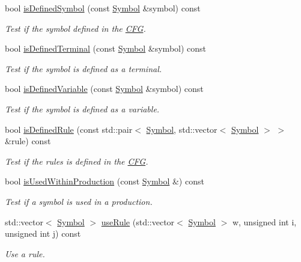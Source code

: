\begin{DoxyCompactItemize}
bool \hyperlink{class_c_f_g_ae31c239915f8b277ac3c5e2411d65546}{is\-Defined\-Symbol} (const \hyperlink{class_symbol}{\-Symbol} \&symbol) const 
\begin{DoxyCompactList}\small\item\em \-Test if the symbol defined in the \hyperlink{class_c_f_g}{\-C\-F\-G}. \end{DoxyCompactList}\item 
bool \hyperlink{class_c_f_g_af948fe36ac86b3a1c1d05f9d017ee7b9}{is\-Defined\-Terminal} (const \hyperlink{class_symbol}{\-Symbol} \&symbol) const 
\begin{DoxyCompactList}\small\item\em \-Test if the symbol is defined as a terminal. \end{DoxyCompactList}\item 
bool \hyperlink{class_c_f_g_a388a133e1134133d5190d8f4e4845042}{is\-Defined\-Variable} (const \hyperlink{class_symbol}{\-Symbol} \&symbol) const 
\begin{DoxyCompactList}\small\item\em \-Test if the symbol is defined as a variable. \end{DoxyCompactList}\item 
bool \hyperlink{class_c_f_g_aef9f3ebd336911e82b732ad30bc85669}{is\-Defined\-Rule} (const std\-::pair$<$ \hyperlink{class_symbol}{\-Symbol}, std\-::vector$<$ \hyperlink{class_symbol}{\-Symbol} $>$ $>$ \&rule) const 
\begin{DoxyCompactList}\small\item\em \-Test if the rules is defined in the \hyperlink{class_c_f_g}{\-C\-F\-G}. \end{DoxyCompactList}\item 
bool \hyperlink{class_c_f_g_a6ab4792601e0a00bbc3cc8c2b3540f6a}{is\-Used\-Within\-Production} (const \hyperlink{class_symbol}{\-Symbol} \&) const 
\begin{DoxyCompactList}\small\item\em \-Test if a symbol is used in a production. \end{DoxyCompactList}\item 
std\-::vector$<$ \hyperlink{class_symbol}{\-Symbol} $>$ \hyperlink{class_c_f_g_a933bbf12de09ca270ea4ee8d08ce8b2d}{use\-Rule} (std\-::vector$<$ \hyperlink{class_symbol}{\-Symbol} $>$ w, unsigned int i, unsigned int j) const 
\begin{DoxyCompactList}\small\item\em \-Use a rule. \end{DoxyCompactList}\item 

\end{DoxyCompactItemize}
